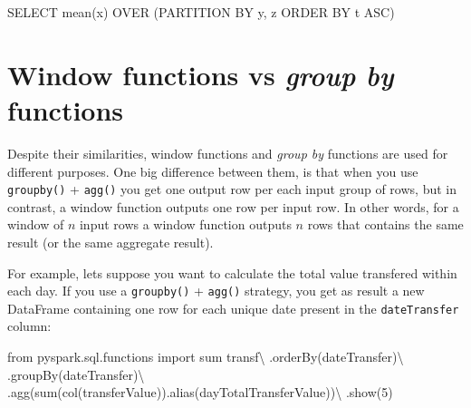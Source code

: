 \documentclass[
  11pt,
  letterpaper,
  DIV=11,
  numbers=noendperiod]{scrreprt}
\newenvironment{Shaded}{\begin{snugshade}}{\end{snugshade}}
\newcommand{\BuiltInTok}[1]{\textcolor[rgb]{0.00,0.23,0.31}{#1}}
\newcommand{\DecValTok}[1]{\textcolor[rgb]{0.68,0.00,0.00}{#1}}
\newcommand{\ImportTok}[1]{\textcolor[rgb]{0.00,0.46,0.62}{#1}}
\newcommand{\KeywordTok}[1]{\textcolor[rgb]{0.00,0.23,0.31}{#1}}
\newcommand{\NormalTok}[1]{\textcolor[rgb]{0.00,0.23,0.31}{#1}}
\newcommand{\OperatorTok}[1]{\textcolor[rgb]{0.37,0.37,0.37}{#1}}
\newcommand{\StringTok}[1]{\textcolor[rgb]{0.13,0.47,0.30}{#1}}
\begin{document}
\begin{Shaded}
\begin{Highlighting}[]
\KeywordTok{SELECT}\NormalTok{ mean(x) }\KeywordTok{OVER}\NormalTok{ (}\KeywordTok{PARTITION} \KeywordTok{BY}\NormalTok{ y, z }\KeywordTok{ORDER} \KeywordTok{BY}\NormalTok{ t }\KeywordTok{ASC}\NormalTok{)}
\end{Highlighting}
\end{Shaded}

\hypertarget{window-functions-vs-group-by-functions}{%
\section{\texorpdfstring{Window functions vs \emph{group by}
functions}{Window functions vs group by functions}}\label{window-functions-vs-group-by-functions}}

Despite their similarities, window functions and \emph{group by}
functions are used for different purposes. One big difference between
them, is that when you use \texttt{groupby()} + \texttt{agg()} you get
one output row per each input group of rows, but in contrast, a window
function outputs one row per input row. In other words, for a window of
\(n\) input rows a window function outputs \(n\) rows that contains the
same result (or the same aggregate result).

For example, lets suppose you want to calculate the total value
transfered within each day. If you use a \texttt{groupby()} +
\texttt{agg()} strategy, you get as result a new DataFrame containing
one row for each unique date present in the \texttt{dateTransfer}
column:

\begin{Shaded}
\begin{Highlighting}[]
\ImportTok{from}\NormalTok{ pyspark.sql.functions }\ImportTok{import} \BuiltInTok{sum}
\NormalTok{transf}\OperatorTok{\textbackslash{}}
\NormalTok{    .orderBy(}\StringTok{\textquotesingle{}dateTransfer\textquotesingle{}}\NormalTok{)}\OperatorTok{\textbackslash{}}
\NormalTok{    .groupBy(}\StringTok{\textquotesingle{}dateTransfer\textquotesingle{}}\NormalTok{)}\OperatorTok{\textbackslash{}}
\NormalTok{    .agg(}\BuiltInTok{sum}\NormalTok{(col(}\StringTok{\textquotesingle{}transferValue\textquotesingle{}}\NormalTok{)).alias(}\StringTok{\textquotesingle{}dayTotalTransferValue\textquotesingle{}}\NormalTok{))}\OperatorTok{\textbackslash{}}
\NormalTok{    .show(}\DecValTok{5}\NormalTok{)}
\end{Highlighting}
\end{Shaded}
\end{document}
